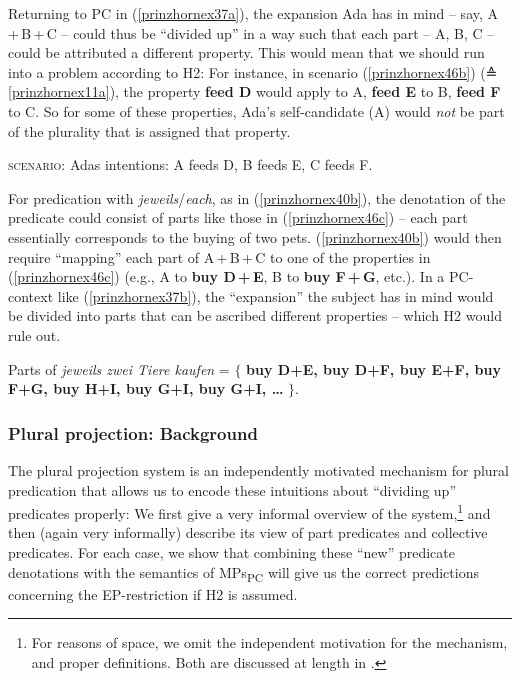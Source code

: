 \documentclass[output=paper]{langscibook}
\begin{document}
Returning to PC in (\ref{prinzhornex37a}), the expansion Ada has in mind -- say, A\,+\,B\,+\,C -- could thus be “divided up” in a way such that each part -- {A}, {B}, {C} -- could be attributed a different property. This would mean that we should run into a problem according to H2: For instance, in scenario (\ref{prinzhornex46b}) (≙\,\ref{prinzhornex11a}), the property \textbf{feed D} would apply to {A},  \textbf{feed E} to {B}, \textbf{feed F} to {C}. So for some of these properties, Ada's self-candidate ({A}) would \textit{not}  be part of the plurality that is assigned that property.

\ea  \textsc{scenario:} Adas intentions: A feeds D, B feeds E, C feeds F. \label{prinzhornex46b} \z

For predication with \textit{jeweils}\slash\textit{each}, as in (\ref{prinzhornex40b}), the denotation of  the predicate could consist of parts like those in (\ref{prinzhornex46c}) -- each part essentially corresponds to the buying of two pets. (\ref{prinzhornex40b}) would then require “mapping” each part of A\,+\,B\,+\,C to one of the properties in (\ref{prinzhornex46c}) (e.g., {A} to \textbf{buy D\,+\,E}, {B} to \textbf{buy F\,+\,G}, etc.). In a PC-context like (\ref{prinzhornex37b}),  the “expansion” the subject has in mind would be divided into parts that can be ascribed different properties -- which H2 would rule out.

\ea 
Parts of \textit{jeweils zwei Tiere kaufen} = $\{$ \textbf{buy D+E, buy D+F, buy E+F,  buy F+G, buy H+I, buy G+I, buy G+I, \dots} $\}$.\label{prinzhornex46c}
\z

\subsubsection{Plural projection: Background}\label{prinzhornsec:4.2.1}

The plural projection system \citep{Schmitt:2019, Haslinger:2018a, Haslinger:2018b} is an independently motivated mechanism for plural predication that allows us to encode these intuitions about “dividing up” predicates properly: We first give a very informal overview of the system,\footnote{For reasons of space, we omit the independent motivation for the mechanism, and proper definitions. Both are discussed at length in \citealt{Schmitt:2019, Haslinger:2018a, Haslinger:2018b}.} and then (again very informally) describe its view of part predicates and collective predicates. For each case, we show that combining these “new” predicate denotations with the semantics of MPs\textsubscript{PC} will give us the correct predictions concerning the EP-restriction if H2 is assumed.
\end{document}
